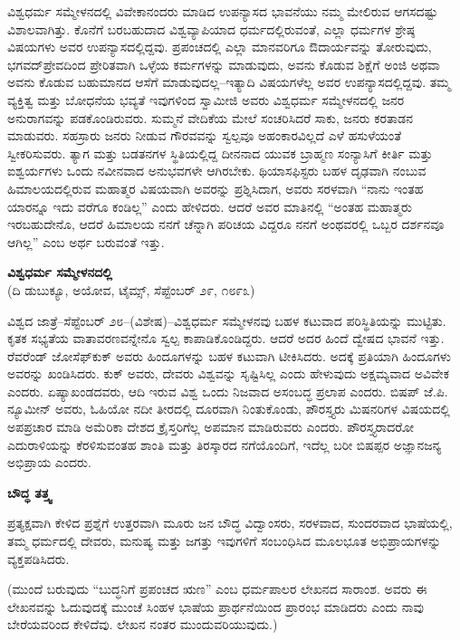 ವಿಶ್ವಧರ್ಮ ಸಮ್ಮೇಳನದಲ್ಲಿ ವಿವೇಕಾನಂದರು ಮಾಡಿದ ಉಪನ್ಯಾಸದ ಭಾವನೆಯು ನಮ್ಮ ಮೇಲಿರುವ ಆಗಸದಷ್ಟು ವಿಶಾಲವಾಗಿತ್ತು. ಕೊನೆಗೆ ಬರಬಹುದಾದ ವಿಶ್ವವ್ಯಾಪಿ\break ಯಾದ ಧರ್ಮದಲ್ಲಿರುವಂತೆ, ಎಲ್ಲಾ ಧರ್ಮಗಳ ಶ್ರೇಷ್ಠ ವಿಷಯಗಳು ಅವರ ಉಪನ್ಯಾಸ\break ದಲ್ಲಿದ್ದವು. ಪ್ರಪಂಚದಲ್ಲಿ ಎಲ್ಲಾ ಮಾನವರಿಗೂ ಔದಾರ್ಯವನ್ನು ತೋರುವುದು, ಭಗವದ್​ ಪ್ರೇವದಿಂದ ಪ್ರೇರಿತವಾಗಿ ಒಳ್ಳೆಯ ಕರ್ಮಗಳನ್ನು ಮಾಡುವುದು, ಅವನು ಕೊಡುವ ಶಿಕ್ಷೆಗೆ ಅಂಜಿ ಅಥವಾ ಅವನು ಕೊಡುವ ಬಹುಮಾನದ ಆಸೆಗೆ ಮಾಡುವುದಲ್ಲ–ಇತ್ಯಾದಿ ವಿಷಯಗಳೆಲ್ಲ ಅವರ ಉಪನ್ಯಾಸದಲ್ಲಿದ್ದವು. ತಮ್ಮ ವ್ಯಕ್ತಿತ್ವ ಮತ್ತು ಬೋಧನೆಯ ಭವ್ಯತೆ ಇವುಗಳಿಂದ ಸ್ವಾಮೀಜಿ ಅವರು ವಿಶ್ವಧರ್ಮ ಸಮ್ಮೇಳನದಲ್ಲಿ ಜನರ ಅನುರಾಗವನ್ನು ಪಡಕೊಂಡಿರುವರು. ಸುಮ್ಮನೆ ವೇದಿಕೆಯ ಮೇಲೆ ಸಂಚರಿಸಿದರೆ ಸಾಕು, ಜನರು ಕರತಾಡನ ಮಾಡುವರು. ಸಹಸ್ರಾರು ಜನರು ನೀಡುವ ಗೌರವವನ್ನು ಸ್ವಲ್ಪವೂ ಅಹಂಕಾರವಿಲ್ಲದೆ ಎಳೆ ಹಸುಳೆಯಂತೆ ಸ್ವೀಕರಿಸುವರು. ತ್ಯಾಗ ಮತ್ತು ಬಡತನಗಳ ಸ್ಥಿತಿಯಲ್ಲಿದ್ದ ದೀನನಾದ ಯುವಕ ಬ್ರಾಹ್ಮಣ ಸಂನ್ಯಾಸಿಗೆ ಕೀರ್ತಿ ಮತ್ತು ಐಶ್ವರ್ಯಗಳು ಒಂದು ನವೀನವಾದ ಅನುಭವಗಳೇ ಆಗಿರಬೇಕು. ಥಿಯಾಸಫಿಸ್ಟರು ಬಹಳ ದೃಢವಾಗಿ ನಂಬುವ ಹಿಮಾಲಯದಲ್ಲಿರುವ ಮಹಾತ್ಮರ ವಿಷಯವಾಗಿ ಅವರನ್ನು ಪ್ರಶ್ನಿಸಿದಾಗ, ಅವರು ಸರಳವಾಗಿ “ನಾನು ಇಂತಹ ಯಾರನ್ನೂ ಇದು ವರೆಗೂ ಕಂಡಿಲ್ಲ” ಎಂದು ಹೇಳಿದರು. ಆದರೆ ಅವರ ಮಾತಿನಲ್ಲಿ “ಅಂತಹ ಮಹಾತ್ಮರು ಇರಬಹುದೇನೊ, ಆದರೆ ಹಿಮಾಲಯ ನನಗೆ ಚೆನ್ನಾಗಿ ಪರಿಚಯ ವಿದ್ದರೂ ನನಗೆ ಅಂಥವರಲ್ಲಿ ಒಬ್ಬರ ದರ್ಶನವೂ ಆಗಿಲ್ಲ” ಎಂಬ ಅರ್ಥ ಬರುವಂತೆ ಇತ್ತು.

\begin{center}
\textbf{ವಿಶ್ವಧರ್ಮ ಸಮ್ಮೇಳನದಲ್ಲಿ}\\ (ದಿ ಡುಬುಕ್ಯೂ, ಅಯೋವ, ಟೈಮ್ಸ್​, ಸೆಪ್ಟೆಂಬರ್​ ೨೯, ೧೮೯೩)
\end{center}

ವಿಶ್ವದ ಜಾತ್ರೆ–ಸೆಪ್ಟೆಂಬರ್​ ೨೮–(ವಿಶೇಷ)–ವಿಶ್ವಧರ್ಮ ಸಮ್ಮೇಳನವು ಬಹಳ ಕಟುವಾದ ಪರಿಸ್ಥಿತಿಯನ್ನು ಮುಟ್ಟಿತು. ಕೃತಕ ಸಭ್ಯತೆಯ ವಾತಾವರಣವನ್ನೇನೊ ಸ್ವಲ್ಪ ಕಾಪಾಡಿ\break ಕೊಂಡಿದ್ದರು. ಆದರೆ ಅದರ ಹಿಂದೆ ದ್ವೇಷದ ಭಾವನೆ ಇತ್ತು. ರೆವರೆಂಡ್​ ಜೋಸೆಫ್​ಕುಕ್​ ಅವರು ಹಿಂದೂಗಳನ್ನು ಬಹಳ ಕಟುವಾಗಿ ಟೀಕಿಸಿದರು. ಅದಕ್ಕೆ ಪ್ರತಿಯಾಗಿ ಹಿಂದೂಗಳು ಅವರನ್ನು ಖಂಡಿಸಿದರು. ಕುಕ್​ ಅವರು, ದೇವರು ವಿಶ್ವವನ್ನು ಸೃಷ್ಟಿಸಿಲ್ಲ ಎಂದು ಹೇಳುವುದು ಅಕ್ಷಮ್ಯವಾದ ಅವಿವೇಕ ಎಂದರು. ಏಷ್ಯಾಖಂಡದವರು, ಆದಿ ಇರುವ ವಿಶ್ವ ಒಂದು ನಿಜವಾದ ಅಸಂಬದ್ಧ ಪ್ರಲಾಪ ಎಂದರು. ಬಿಷಪ್​ ಜೆ.ಪಿ. ನ್ಯೂಮೀನ್​ ಅವರು, ಓಹಿಯೋ ನದೀ ತೀರದಲ್ಲಿ ದೂರವಾಗಿ ನಿಂತುಕೊಂಡು, ಪೌರಸ್ತ್ಯರು ಮಿಷನರಿಗಳ ವಿಷಯದಲ್ಲಿ ಅಪಪ್ರಚಾರ ಮಾಡಿ ಅಮೆರಿಕಾ ದೇಶದ ಕ್ರೈಸ್ತರಿಗೆಲ್ಲ ಅಪಮಾನ ಮಾಡಿರುವರು ಎಂದರು. ಪೌರಸ್ತ್ಯರಾದರೋ ಎದುರಾಳಿಯನ್ನು ಕೆರಳಿಸುವಂತಹ ಶಾಂತಿ ಮತ್ತು ತಿರಸ್ಕಾರದ ನಗೆಯೊಂದಿಗೆ, ಇದೆಲ್ಲ ಬರೀ ಬಿಷಪ್ಪರ ಅಜ್ಞಾನಜನ್ಯ ಅಭಿಪ್ರಾಯ ಎಂದರು.

\begin{center}
\textbf{ಬೌದ್ಧ ತತ್ತ್ವ}
\end{center}

ಪ್ರತ್ಯಕ್ಷವಾಗಿ ಕೇಳಿದ ಪ್ರಶ್ನೆಗೆ ಉತ್ತರವಾಗಿ ಮೂರು ಜನ ಬೌದ್ಧ ವಿದ್ವಾಂಸರು, ಸರಳವಾದ, ಸುಂದರವಾದ ಭಾಷೆಯಲ್ಲಿ, ತಮ್ಮ ಧರ್ಮದಲ್ಲಿ ದೇವರು, ಮನುಷ್ಯ ಮತ್ತು ಜಗತ್ತು ಇವುಗಳಿಗೆ ಸಂಬಂಧಿಸಿದ ಮೂಲಭೂತ ಅಭಿಪ್ರಾಯಗಳನ್ನು ವ್ಯಕ್ತಪಡಿಸಿದರು.

(ಮುಂದೆ ಬರುವುದು “ಬುದ್ಧನಿಗೆ ಪ್ರಪಂಚದ ಋಣ” ಎಂಬ ಧರ್ಮಪಾಲರ ಲೇಖನದ ಸಾರಾಂಶ. ಅವರು ಈ ಲೇಖನವನ್ನು ಓದುವುದಕ್ಕೆ ಮುಂಚೆ ಸಿಂಹಳ ಭಾಷೆಯ ಪ್ರಾರ್ಥನೆಯಿಂದ ಪ್ರಾರಂಭ ಮಾಡಿದರು ಎಂದು ನಾವು ಬೇರೆಯವರಿಂದ ಕೇಳಿದೆವು. ಲೇಖನ ನಂತರ ಮುಂದುವರಿಯುವುದು.)

